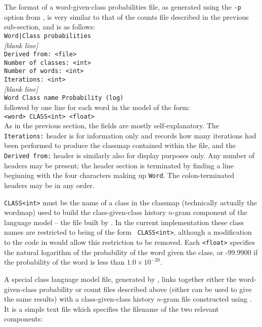 The format of a word-given-class probabilities file, as generated using the
\texttt{-p} option from , is very similar to that of
the counts file described in the previous sub-section, and is as follows:\\
\texttt{Word|Class probabilities}\\
\textit{[blank line]}\\
\texttt{Derived from: <file>}\\
\texttt{Number of classes: <int>}\\
\texttt{Number of words: <int>}\\
\texttt{Iterations: <int>}\\
\textit{[blank line]}\\
\texttt{Word    Class name   Probability (log)}\\
followed by one line for each word in the model of the form:\\
\texttt{<word> CLASS<int> <float>}\\

As in the previous section, the fields are mostly self-explanatory.
The {\tt Iterations:} header is for information only and records how
many iterations had been performed to produce the classmap contained
within the file, and the {\tt Derived from:} header is similarly also
for display purposes only.  Any number of headers may be present; the
header section is terminated by finding a line beginning with the four
characters making up {\tt Word}. The colon-terminated headers may be
in any order.

{\tt CLASS<int>} must be the name of a
class in the classmap (technically actually the wordmap) used to build
the class-given-class history $n$-gram component of the language model
-- the file built by .  In the current implementation
these class names are restricted to being of the form {\tt
CLASS<int>}, although a modification to the code in 
would allow this restriction to be removed.  Each {\tt <float>}
specifies the natural logarithm of the probability of the word given
the class, or -99.9900 if the probability of the word is less than
$1.0\times10^{-20}$.


A special class language model file, generated by ,
links together either the word-given-class probability or count files
described above (either can be used to give the same results) with a
class-given-class history $n$-gram file constructed using
.  It is a simple text file which specifies the filename
of the two relevant components:

